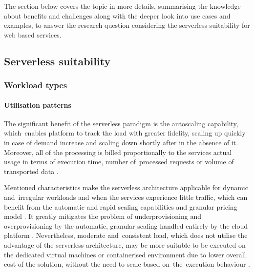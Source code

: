 The section below covers the topic in more details, summarising the knowledge about benefits and challenges along with the deeper look into use cases and examples, to answer the research question considering the serverless suitability for web based services.

\subsection{Serverless suitability}

\subsubsection{Workload types}

\paragraph{Utilisation patterns} \label{chapter:serverless-suitability-utilisation-patterns}

The significant benefit of the serverless paradigm is the autoscaling capability, which~enables platform to track the load with greater fidelity, scaling up quickly in case of demand increase and scaling down shortly after in the absence of it.
Moreover, all of the processing is billed proportionally to the services actual usage in terms of execution time, number of~processed requests or volume of transported data \cite{BerkeleyServerless}.

Mentioned characteristics make the serverless architecture applicable for dynamic and~irregular workloads and when the services experience little traffic, which can benefit from the automatic and rapid scaling capabilities and granular pricing model \cite{EvaluationOfServerlessApplicationProgrammingModel}.
It greatly mitigates the problem of underprovisioning and overprovisioning by the automatic, granular scaling handled entirely by the cloud platform \cite{MartinFowlerServerless}.
Nevertheless, moderate and~consistent load, which does not utilise the advantage of the serverless architecture, may be more suitable to be executed on the dedicated virtual machines or containerised environment due to lower overall cost of the solution, without the need to scale based on~the~execution behaviour \cite{LeveragingServerlessCloudComputingArchitectures}.

